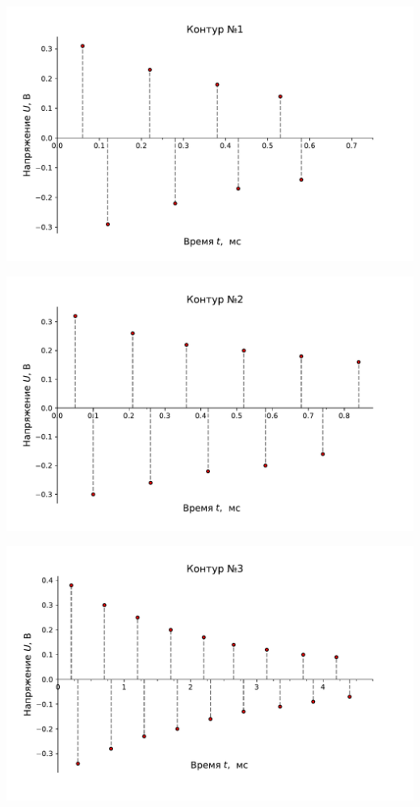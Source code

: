\documentclass[ a4paper]{article}
\begin{document}
\begin{center}
	\includegraphics[scale=0.65]{pic1.pdf}
\end{center}
\begin{center}
	\includegraphics[scale=0.65]{pic2.pdf}
\end{center}
\begin{center}
	\includegraphics[scale=0.65]{pic3.pdf}
\end{center}
\end{document}
